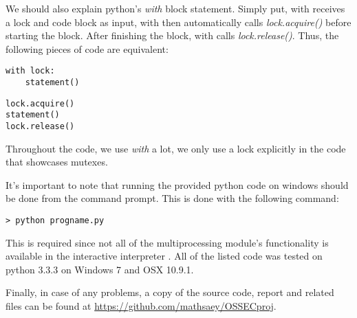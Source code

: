 We should also explain python's \textit{with} block statement. Simply put, with receives a lock and code block as input, with then automatically calls \textit{lock.acquire()} before starting the block. After finishing the block, with calls \textit{lock.release()}.
Thus, the following pieces of code are equivalent:

\begin{center}
\begin{minipage}[c]{0.25\textwidth}
\begin{lstlisting}[frame=none, numbers=none]
with lock:
	statement()
\end{lstlisting}
\end{minipage}
\begin{minipage}[c]{0.25\textwidth}
\begin{lstlisting}[frame=none, numbers=none]
lock.acquire()
statement()
lock.release()
\end{lstlisting}
\end{minipage}
\end{center}
Throughout the code, we use \textit{with} a lot, we only use a lock explicitly in the code that showcases mutexes.


It's important to note that running the provided python code on windows should be done from the command prompt. This is done with the following command:

\begin{verbatim}
> python progname.py
\end{verbatim}

This is required since not all of the multiprocessing module's functionality is available in the interactive interpreter \cite{pythonmulti}. All of the listed code was tested on python 3.3.3 on Windows 7 and OSX 10.9.1. 

Finally, in case of any problems, a copy of the source code, report and related files can be found at \url{https://github.com/mathsaey/OSSECproj}.